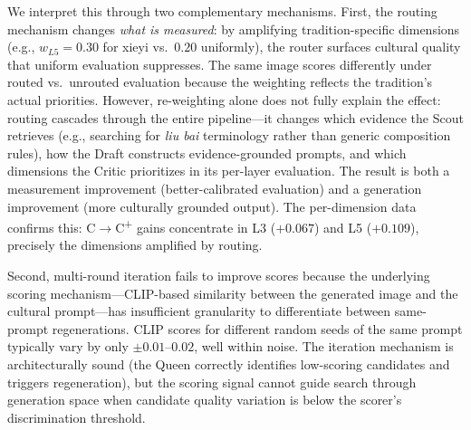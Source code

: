\documentclass[sigconf, screen, review, anonymous]{acmart}
\newcommand{\Lx}[1]{L#1}
\begin{document}
We interpret this through two complementary mechanisms.
First, the routing mechanism changes \emph{what is measured}: by amplifying tradition-specific dimensions (e.g., $w_{\Lx{5}} = 0.30$ for xieyi vs.\ $0.20$ uniformly), the router surfaces cultural quality that uniform evaluation suppresses.
The same image scores differently under routed vs.\ unrouted evaluation because the weighting reflects the tradition's actual priorities.
However, re-weighting alone does not fully explain the effect: routing cascades through the entire pipeline---it changes which evidence the Scout retrieves (e.g., searching for \emph{liu bai} terminology rather than generic composition rules), how the Draft constructs evidence-grounded prompts, and which dimensions the Critic prioritizes in its per-layer evaluation.
The result is both a measurement improvement (better-calibrated evaluation) and a generation improvement (more culturally grounded output).
The per-dimension data confirms this: C$\to$C\textsuperscript{+} gains concentrate in \Lx{3} ($+0.067$) and \Lx{5} ($+0.109$), precisely the dimensions amplified by routing.

Second, multi-round iteration fails to improve scores because the underlying scoring mechanism---CLIP-based similarity between the generated image and the cultural prompt---has insufficient granularity to differentiate between same-prompt regenerations.
CLIP scores for different random seeds of the same prompt typically vary by only $\pm 0.01$--$0.02$, well within noise.
The iteration mechanism is architecturally sound (the Queen correctly identifies low-scoring candidates and triggers regeneration), but the scoring signal cannot guide search through generation space when candidate quality variation is below the scorer's discrimination threshold.
\end{document}
